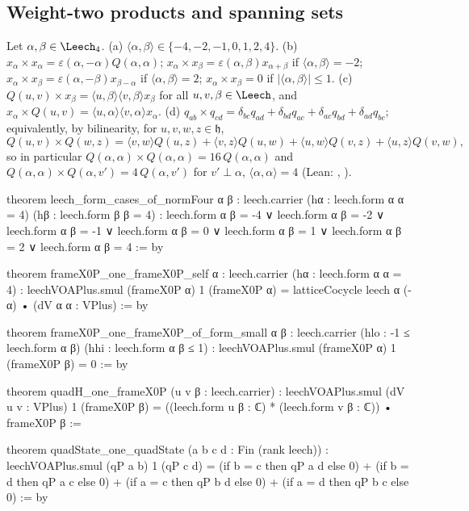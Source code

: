 \subsection{Weight-two products and spanning sets}

\begin{lemma}\label{ch20:lem:products}
Let $\alpha,\beta\in\chtwentyLf$.  (a) $\langle\alpha,\beta\rangle\in\{-4,-2,-1,0,1,2,4\}$.  (b) $x_\alpha\times x_\alpha=\varepsilon(\alpha,-\alpha)Q(\alpha,\alpha)$;
$x_\alpha\times x_\beta=\varepsilon(\alpha,\beta)x_{\alpha+\beta}$ if $\langle\alpha,\beta\rangle=-2$; $x_\alpha\times x_\beta=\varepsilon(\alpha,-\beta)x_{\beta-\alpha}$ if
$\langle\alpha,\beta\rangle=2$; $x_\alpha\times x_\beta=0$ if $|\langle\alpha,\beta\rangle|\le1$.  (c) $Q(u,v)\times x_\beta=\langle u,\beta\rangle\langle v,\beta\rangle x_\beta$
for all $u,v,\beta\in\Leech$, and $x_\alpha\times Q(u,v)=\langle u,\alpha\rangle\langle v,\alpha\rangle x_\alpha$.  (d)
$q_{ab}\times q_{cd}=\delta_{bc}q_{ad}+\delta_{bd}q_{ac}+\delta_{ac}q_{bd}+\delta_{ad}q_{bc}$; equivalently, by bilinearity, for
$u,v,w,z\in\mathfrak h$,
\begin{equation*}
  Q(u,v)\times Q(w,z)=\langle v,w\rangle Q(u,z)+\langle v,z\rangle Q(u,w)+\langle u,w\rangle Q(v,z)+\langle u,z\rangle Q(v,w),
\end{equation*}
so in particular $Q(\alpha,\alpha)\times Q(\alpha,\alpha)=16\,Q(\alpha,\alpha)$ and $Q(\alpha,\alpha)\times Q(\alpha,v')=4\,Q(\alpha,v')$ for
$v'\perp\alpha$, $\langle\alpha,\alpha\rangle=4$ (Lean: , ).
\end{lemma}
\begin{leancode}
theorem leech_form_cases_of_normFour {α β : leech.carrier}
    (hα : leech.form α α = 4) (hβ : leech.form β β = 4) :
    leech.form α β = -4 ∨ leech.form α β = -2 ∨ leech.form α β = -1 ∨
      leech.form α β = 0 ∨ leech.form α β = 1 ∨ leech.form α β = 2 ∨
      leech.form α β = 4 := by

theorem frameX0P_one_frameX0P_self {α : leech.carrier} (hα : leech.form α α = 4) :
    leechVOAPlus.smul (frameX0P α) 1 (frameX0P α) =
      latticeCocycle leech α (-α) • (dV α α : VPlus) := by

theorem frameX0P_one_frameX0P_of_form_small {α β : leech.carrier}
    (hlo : -1 ≤ leech.form α β) (hhi : leech.form α β ≤ 1) :
    leechVOAPlus.smul (frameX0P α) 1 (frameX0P β) = 0 := by

theorem quadH_one_frameX0P (u v β : leech.carrier) :
    leechVOAPlus.smul (dV u v : VPlus) 1 (frameX0P β) =
      ((leech.form u β : ℂ) * (leech.form v β : ℂ)) • frameX0P β :=

theorem quadState_one_quadState (a b c d : Fin (rank leech)) :
    leechVOAPlus.smul (qP a b) 1 (qP c d) =
      (if b = c then qP a d else 0) + (if b = d then qP a c else 0) +
      (if a = c then qP b d else 0) + (if a = d then qP b c else 0) := by
\end{leancode}
